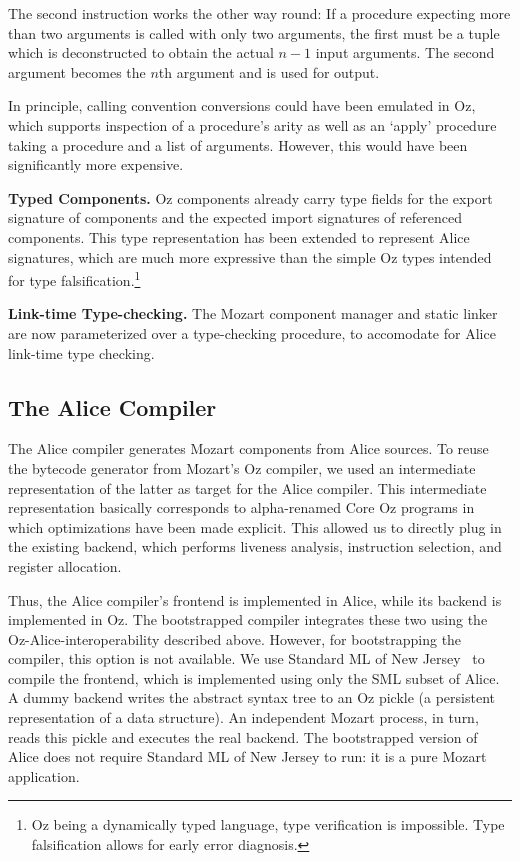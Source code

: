 \documentclass{entcs}
\begin{document}
The second instruction works the other way round:  If a procedure expecting
more than two arguments is called with only two arguments, the first must
be a tuple which is deconstructed to obtain the actual $n - 1$ input
arguments.  The second argument becomes the $n$th argument and is used
for output.

In principle, calling convention conversions could have been emulated in
Oz, which supports inspection of a procedure's arity as well as an `apply'
procedure taking a procedure and a list of arguments.  However, this
would have been significantly more expensive.

{\bfseries Typed Components.}
Oz components already carry type fields for the export signature of
components and the expected import signatures of referenced components.
This type representation has been extended to represent Alice signatures,
which are much more expressive than the simple Oz types intended for type
falsification.\footnote{Oz being a dynamically typed language, type
verification is impossible.  Type falsification allows for early error
diagnosis.}

{\bfseries Link-time Type-checking.}
The Mozart component manager and static linker are now parameterized
over a type-checking procedure, to accomodate for Alice link-time type
checking.

\subsection{The Alice Compiler}

The Alice compiler generates Mozart components from Alice sources.
To reuse the bytecode generator from Mozart's Oz compiler, we used
an intermediate representation of the latter as target for the Alice
compiler.  This intermediate representation basically corresponds to
alpha-renamed Core Oz programs in which optimizations have been made
explicit.  This allowed us to directly plug in the existing backend,
which performs liveness analysis, instruction selection, and register
allocation.

Thus, the Alice compiler's frontend is implemented in Alice, while its
backend is implemented in  Oz.  The bootstrapped compiler integrates these
two using the Oz-Alice-interoperability described above.  However, for
bootstrapping the compiler, this option is not available.  We use
Standard ML of New Jersey~\cite{SMLofNJ} to compile the frontend, which
is implemented using only the SML subset of Alice.  A dummy backend
writes the abstract syntax tree to an Oz pickle (a persistent representation
of a data structure).  An independent Mozart process, in turn, reads this
pickle and executes the real backend.  The bootstrapped version of Alice does
not require Standard ML of New Jersey to run: it is a pure Mozart application.
\end{document}
